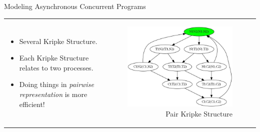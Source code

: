\documentclass{bredelebeamer}
\begin{document}
\begin{frame}{Modeling Asynchronous Concurrent Programs} %
\begin{tabular}{l r}
\begin{minipage}{0.5\textwidth}
\vspace{-5mm}
\hspace{-5mm}
\noindent {\large Multi-Kripke Structure:}
\begin{itemize}
\item Several Kripke Structure.
\item Each Kripke Structure relates to two processes.
\item Doing things in \emph{pairwise representation} is more efficient!
\end{itemize} 
\end{minipage}
&
\begin{minipage}{0.5\textwidth}
\begin{figure}
\centering
\includegraphics[scale=0.3]{multi.jpg}
\caption{Pair Kripke Structure}
\end{figure}
\end{minipage}
\end{tabular}
\end{frame}
\end{document}
